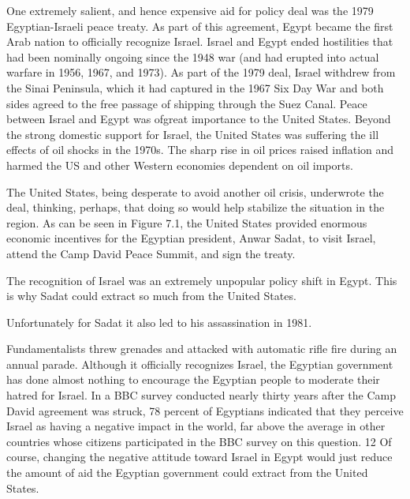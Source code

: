 \documentclass[10pt]{article}
\begin{document}
{\large One extremely salient, and hence expensive aid for policy deal was the
1979 Egyptian-Israeli peace treaty. As part of this agreement, Egypt became the
first Arab nation to officially recognize Israel. Israel and Egypt ended
hostilities that had been nominally ongoing since the 1948 war (and had erupted
into actual warfare in 1956, 1967, and 1973). As part of the 1979 deal, Israel
withdrew from the Sinai Peninsula, which it had captured in the 1967 Six Day War
and both sides agreed to the free passage of shipping through the Suez Canal.
Peace between Israel and Egypt was ofgreat importance to the United States.
Beyond the strong domestic support for Israel, the United States was suffering
the ill effects of oil shocks in the 1970s. The sharp rise in oil prices raised
inflation and harmed the US and other Western economies dependent on oil
imports.}

{\large The United States, being desperate to avoid another oil crisis,
underwrote the deal, thinking, perhaps, that doing so would help stabilize the
situation in the region. As can be seen in Figure 7.1, the United States provided
enormous economic incentives for the Egyptian president, Anwar Sadat, to visit
Israel, attend the Camp David Peace Summit, and sign the treaty.}

{\large The recognition of Israel was an extremely unpopular policy shift in
Egypt. This is why Sadat could extract so much from the United States.}

{\large Unfortunately for Sadat it also led to his assassination in 1981.}

{\large Fundamentalists threw grenades and attacked with automatic rifle fire
during an annual parade. Although it officially recognizes Israel, the Egyptian
government has done almost nothing to encourage the Egyptian people to moderate
their hatred for Israel. In a BBC survey conducted nearly thirty years after the
Camp David agreement was struck, 78 percent of Egyptians indicated that they
perceive Israel as having a negative impact in the world, far above the average
in other countries whose citizens participated in the BBC survey on this
question. 12 Of course, changing the negative attitude toward Israel in Egypt
would just reduce the amount of aid the Egyptian government could extract from
the United States.}
\end{document}
